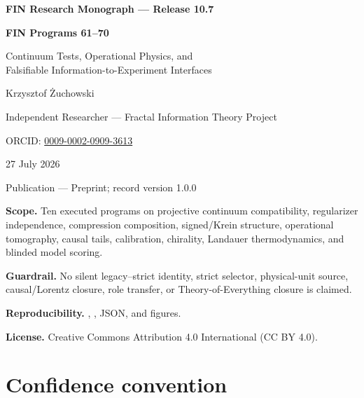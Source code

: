 \documentclass[11pt,a4paper,openany]{report}
\begin{document}
\hypersetup{pageanchor=false}
\begin{titlepage}
\centering
\vspace*{9mm}
{\Large\bfseries FIN Research Monograph --- Release 10.7\par}
\vspace{11mm}
{\Huge\bfseries FIN Programs 61--70\par}
\vspace{6mm}
{\Large Continuum Tests, Operational Physics, and\\Falsifiable Information-to-Experiment Interfaces\par}
\vspace{17mm}
{\Large Krzysztof \.Zuchowski\par}
\vspace{2mm}
{\normalsize Independent Researcher --- Fractal Information Theory Project\par}
\vspace{2mm}
{\normalsize ORCID: \href{https://orcid.org/0009-0002-0909-3613}{0009-0002-0909-3613}\par}
\vspace{10mm}
{\large 27 July 2026\par}
{\normalsize Publication --- Preprint; record version 1.0.0\par}
\vfill
\begin{minipage}{0.88\textwidth}
\small
\textbf{Scope.} Ten executed programs on projective continuum compatibility,
regularizer independence, compression composition, signed/Krein structure,
operational tomography, causal tails, calibration, chirality, Landauer
thermodynamics, and blinded model scoring.

\medskip
\textbf{Guardrail.} No silent legacy--strict identity, strict selector,
physical-unit source, causal/Lorentz closure, role transfer, or
Theory-of-Everything closure is claimed.

\medskip
\textbf{Reproducibility.}
,
, JSON, and figures.

\medskip
\textbf{License.} Creative Commons Attribution 4.0 International (CC BY 4.0).
\end{minipage}
\vfill
\end{titlepage}
\hypersetup{pageanchor=true}

\tableofcontents
\clearpage
{}

\section{Confidence convention}
\end{document}
